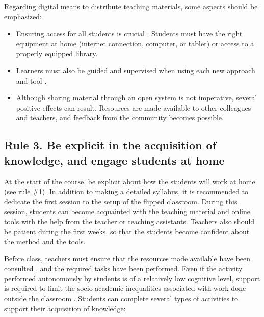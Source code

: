 \documentclass[10pt,letterpaper]{article}
\begin{document}
Regarding digital means to distribute teaching materials, some aspects should be emphasized:

\begin{itemize}

\item Ensuring access for all students is crucial \cite{lo_critical_2017}. 
Students must have the right equipment at home (internet connection, computer, or tablet) 
or access to a properly equipped library.

\item Learners must also be guided and supervised when using each new approach and tool \cite{lo_critical_2017}.

\item Although sharing material through an open system is not imperative, several positive effects can result. 
Resources are made available to other colleagues and teachers, and feedback from the community becomes possible.

\end{itemize}

\subsection{Rule 3. Be explicit in the acquisition of knowledge, and engage students at home}

At the start of the course, be explicit about how the students will
work at home (see rule \#1). In addition to making a detailed syllabus, it is
recommended to dedicate the first session to the setup of the
flipped classroom. During this session, students can become acquainted with the teaching material
and online tools with the help from the teacher or teaching assistants.
Teachers also should be patient during the first weeks, so that the
students become confident about the method and the tools.

Before class, teachers must ensure that the resources made available
have been consulted \cite{lo_critical_2017}, and the required tasks have been performed. 
Even if the activity performed autonomously by students is of a relatively low cognitive level, 
support is required to limit the socio-academic inequalities associated 
with work done outside the classroom \cite{rayou_faire_2010}. 
Students can complete several types of activities to support their acquisition of knowledge:
\end{document}
